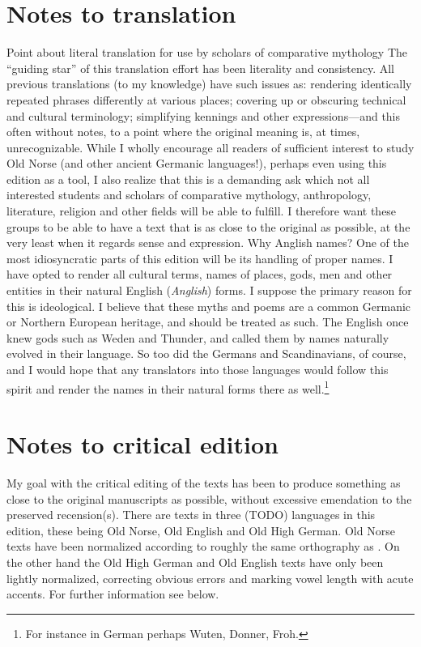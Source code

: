 \chapter{Notes to translation}
  Point about literal translation for use by scholars of comparative mythology
    The “guiding star” of this translation effort has been literality and consistency. All previous translations (to my knowledge) have such issues as: rendering identically repeated phrases differently at various places; covering up or obscuring technical and cultural terminology; simplifying kennings and other expressions—and this often without notes, to a point where the original meaning is, at times, unrecognizable.
    While I wholly encourage all readers of sufficient interest to study Old Norse (and other ancient Germanic languages!), perhaps even using this edition as a tool, I also realize that this is a demanding ask which not all interested students and scholars of comparative mythology, anthropology, literature, religion and other fields will be able to fulfill. I therefore want these groups to be able to have a text that is as close to the original as possible, at the very least when it regards sense and expression.
  Why Anglish names?
    One of the most idiosyncratic parts of this edition will be its handling of proper names. I have opted to render all cultural terms, names of places, gods, men and other entities in their natural English (\emph{Anglish}) forms. I suppose the primary reason for this is ideological. I believe that these myths and poems are a common Germanic or Northern European heritage, and should be treated as such. The English once knew gods such as Weden and Thunder, and called them by names naturally evolved in their language. So too did the Germans and Scandinavians, of course, and I would hope that any translators into those languages would follow this spirit and render the names in their natural forms there as well.\footnote{For instance in German perhaps Wuten, Donner, Froh.}

\chapter{Notes to critical edition}
  My goal with the critical editing of the texts has been to produce something as close to the original manuscripts as possible, without excessive emendation to the preserved recension(s). There are texts in three (TODO) languages in this edition, these being Old Norse, Old English and Old High German. Old Norse texts have been normalized according to roughly the same orthography as \textcite{FinnurEdda}. On the other hand the Old High German and Old English texts have only been lightly normalized, correcting obvious errors and marking vowel length with acute accents. For further information see below.

